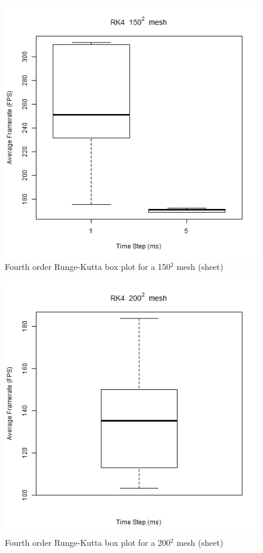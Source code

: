       \begin{figure}
    \begin{center}
      \includegraphics[scale=.9]{Figures/sheet_rk4_150_box}
    \end{center}
    \caption{Fourth order Runge-Kutta box plot for a 150$^{2}$ mesh (sheet)}
    \label{fig:rk4 box 150 sheet}
  \end{figure}
  
      \begin{figure}
    \begin{center}
      \includegraphics[scale=.9]{Figures/sheet_rk4_200_box}
    \end{center}
    \caption{Fourth order Runge-Kutta box plot for a 200$^{2}$ mesh (sheet)}
    \label{fig:rk4 box 200 sheet}
  \end{figure}
  
